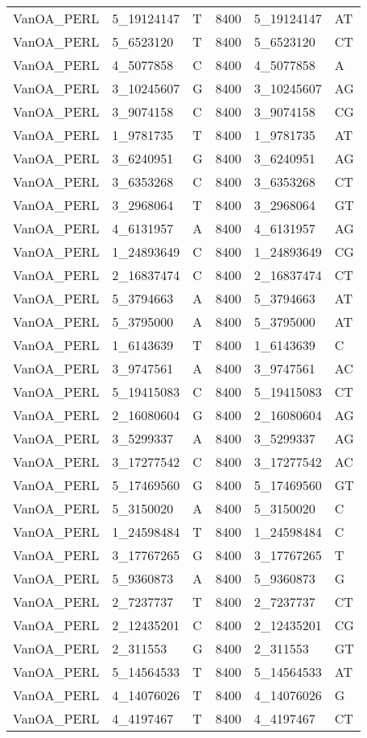 \begin{center}
\begin{longtable}{|l|l|l|l|l|l|}
VanOA\_PERL&5\_19124147&T&8400&5\_19124147&AT\\
VanOA\_PERL&5\_6523120&T&8400&5\_6523120&CT\\
VanOA\_PERL&4\_5077858&C&8400&4\_5077858&A\\
VanOA\_PERL&3\_10245607&G&8400&3\_10245607&AG\\
VanOA\_PERL&3\_9074158&C&8400&3\_9074158&CG\\
VanOA\_PERL&1\_9781735&T&8400&1\_9781735&AT\\
VanOA\_PERL&3\_6240951&G&8400&3\_6240951&AG\\
VanOA\_PERL&3\_6353268&C&8400&3\_6353268&CT\\
VanOA\_PERL&3\_2968064&T&8400&3\_2968064&GT\\
VanOA\_PERL&4\_6131957&A&8400&4\_6131957&AG\\
VanOA\_PERL&1\_24893649&C&8400&1\_24893649&CG\\
VanOA\_PERL&2\_16837474&C&8400&2\_16837474&CT\\
VanOA\_PERL&5\_3794663&A&8400&5\_3794663&AT\\
VanOA\_PERL&5\_3795000&A&8400&5\_3795000&AT\\
VanOA\_PERL&1\_6143639&T&8400&1\_6143639&C\\
VanOA\_PERL&3\_9747561&A&8400&3\_9747561&AC\\
VanOA\_PERL&5\_19415083&C&8400&5\_19415083&CT\\
VanOA\_PERL&2\_16080604&G&8400&2\_16080604&AG\\
VanOA\_PERL&3\_5299337&A&8400&3\_5299337&AG\\
VanOA\_PERL&3\_17277542&C&8400&3\_17277542&AC\\
VanOA\_PERL&5\_17469560&G&8400&5\_17469560&GT\\
VanOA\_PERL&5\_3150020&A&8400&5\_3150020&C\\
VanOA\_PERL&1\_24598484&T&8400&1\_24598484&C\\
VanOA\_PERL&3\_17767265&G&8400&3\_17767265&T\\
VanOA\_PERL&5\_9360873&A&8400&5\_9360873&G\\
VanOA\_PERL&2\_7237737&T&8400&2\_7237737&CT\\
VanOA\_PERL&2\_12435201&C&8400&2\_12435201&CG\\
VanOA\_PERL&2\_311553&G&8400&2\_311553&GT\\
VanOA\_PERL&5\_14564533&T&8400&5\_14564533&AT\\
VanOA\_PERL&4\_14076026&T&8400&4\_14076026&G\\
VanOA\_PERL&4\_4197467&T&8400&4\_4197467&CT\\

\end{longtable}
\end{center}
